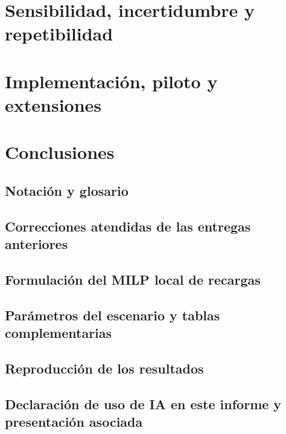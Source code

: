 \documentclass[pdftex,spanish]{pucthesis}	%
\begin{document}
\chapter[SENSIBILIDAD, INCERTIDUMBRE Y REPETIBILIDAD]{Sensibilidad, incertidumbre y repetibilidad} \label{ch:sensibilidad}


\chapter[IMPLEMENTACIÓN, PILOTO Y EXTENSIONES]{Implementación, piloto y extensiones} \label{ch:piloto}


\chapter[CONCLUSIONES]{Conclusiones} \label{ch:conclusiones}


\cleardoublepage
{} \label{references}

\renewcommand{\bibname}{REFERENCIAS}


\appendix

\newpage
\section[Notación y glosario]{Notación y glosario} \label{an:notacion}


\newpage
\section[Correcciones atendidas]{Correcciones atendidas de las entregas anteriores} \label{an:correcciones}


\newpage
\section[Formulación del MILP local de recargas]{Formulación del MILP local de recargas} \label{an:milp-local}


\newpage
\section[Parámetros y tablas complementarias]{Parámetros del escenario y tablas complementarias} \label{an:parametros}


\newpage
\section[Reproducción de los resultados]{Reproducción de los resultados} \label{an:reproduccion}


\newpage
\section[Declaración de uso de IA]{Declaración de uso de IA en este informe y presentación asociada} \label{an:ia}

\end{document}
